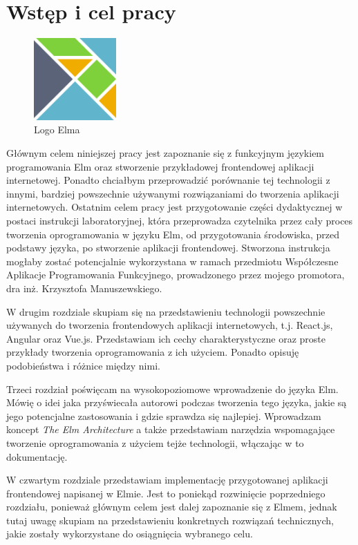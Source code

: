 \documentclass[twoside,a4paper]{report}
\begin{document}
\chapter{Wstęp i cel pracy}
\begin{figure}
    \centering
    \includegraphics[width=0.28\textwidth]{img/elm_logo.png}
    \caption*{Logo Elma}\label{fig:elm_logo}
\end{figure}

Głównym celem niniejszej pracy jest zapoznanie się z funkcyjnym językiem programowania Elm oraz stworzenie przykładowej frontendowej aplikacji internetowej.
Ponadto chciałbym przeprowadzić porównanie tej technologii z innymi, bardziej powszechnie używanymi rozwiązaniami do tworzenia aplikacji internetowych.
Ostatnim celem pracy jest przygotowanie części dydaktycznej w postaci instrukcji laboratoryjnej, która przeprowadza czytelnika przez cały proces tworzenia oprogramowania w języku Elm, od przygotowania środowiska, przed podstawy języka, po stworzenie aplikacji frontendowej.
Stworzona instrukcja mogłaby zostać potencjalnie wykorzystana w ramach przedmiotu Współczesne Aplikacje Programowania Funkcyjnego, prowadzonego przez mojego promotora, dra inż. Krzysztofa Manuszewskiego.

W drugim rozdziale skupiam się na przedstawieniu technologii powszechnie używanych do tworzenia frontendowych aplikacji internetowych, t.j. React.js, Angular oraz Vue.js.
Przedstawiam ich cechy charakterystyczne oraz proste przykłady tworzenia oprogramowania z ich użyciem.
Ponadto opisuję podobieństwa i różnice między nimi.

Trzeci rozdział poświęcam na wysokopoziomowe wprowadzenie do języka Elm.
Mówię o idei jaka przyświecała autorowi podczas tworzenia tego języka, jakie są jego potencjalne zastosowania i gdzie sprawdza się najlepiej.
Wprowadzam koncept \textit{The Elm Architecture} a także przedstawiam narzędzia wspomagające tworzenie oprogramowania z użyciem tejże technologii, włączając w to dokumentację.

W czwartym rozdziale przedstawiam implementację przygotowanej aplikacji frontendowej napisanej w Elmie.
Jest to poniekąd rozwinięcie poprzedniego rozdziału, ponieważ głównym celem jest dalej zapoznanie się z Elmem, jednak tutaj uwagę skupiam na przedstawieniu konkretnych rozwiązań technicznych, jakie zostały wykorzystane do osiągnięcia wybranego celu.
\end{document}
